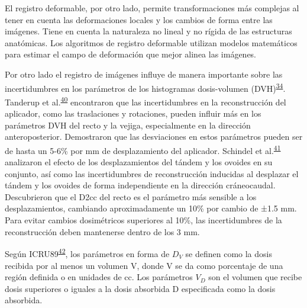 \documentclass[
  a4paper,
]{scrreprt}
\begin{document}
El registro deformable, por otro lado, permite transformaciones más
complejas al tener en cuenta las deformaciones locales y los cambios de
forma entre las imágenes. Tiene en cuenta la naturaleza no lineal y no
rígida de las estructuras anatómicas. Los algoritmos de registro
deformable utilizan modelos matemáticos para estimar el campo de
deformación que mejor alinea las imágenes.

Por otro lado el registro de imágenes influye de manera importante sobre
las incertidumbres en los parámetros de los histogramas dosis-volumen
(DVH)\textsuperscript{\protect\hyperlink{ref-richart2018}{34}}. Tanderup
et al.\textsuperscript{\protect\hyperlink{ref-tanderup2008}{40}}
encontraron que las incertidumbres en la reconstrucción del aplicador,
como las traslaciones y rotaciones, pueden influir más en los parámetros
DVH del recto y la vejiga, especialmente en la dirección
anteroposterior. Demostraron que las desviaciones en estos parámetros
pueden ser de hasta un 5-6\% por mm de desplazamiento del aplicador.
Schindel et
al.\textsuperscript{\protect\hyperlink{ref-schindel2013}{41}} analizaron
el efecto de los desplazamientos del tándem y los ovoides en su
conjunto, así como las incertidumbres de reconstrucción inducidas al
desplazar el tándem y los ovoides de forma independiente en la dirección
cráneocaudal. Descubrieron que el D2cc del recto es el parámetro más
sensible a los desplazamientos, cambiando aproximadamente un 10\% por
cambio de ±1.5 mm. Para evitar cambios dosimétricos superiores al 10\%,
las incertidumbres de la reconstrucción deben mantenerse dentro de los 3
mm.

\begin{tcolorbox}[enhanced jigsaw, leftrule=.75mm, bottomtitle=1mm, colframe=quarto-callout-note-color-frame, toptitle=1mm, breakable, colbacktitle=quarto-callout-note-color!10!white, colback=white, titlerule=0mm, toprule=.15mm, title=\textcolor{quarto-callout-note-color}{\faInfo}\hspace{0.5em}{Nota}, coltitle=black, arc=.35mm, rightrule=.15mm, bottomrule=.15mm, left=2mm, opacityback=0, opacitybacktitle=0.6]

Según ICRU89\textsuperscript{\protect\hyperlink{ref-ICRU89}{42}}, los
parámetros en forma de \(D_V\) se definen como la dosis recibida por al
menos un volumen V, donde V se da como porcentaje de una región definida
o en unidades de cc. Los parámetros \(V_D\) son el volumen que recibe
dosis superiores o iguales a la dosis absorbida D especificada como la
dosis absorbida.

\end{tcolorbox}
\end{document}
